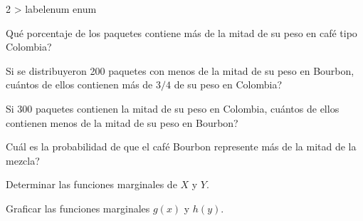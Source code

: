 \documentclass[11pt,letterpaper]{article}
\makeatletter
\renewenvironment{enumerate}
  {\ifnum \@enumdepth >\thr@@\@toodeep\else
   \advance\@enumdepth\@ne
   \edef\@enumctr{enum\romannumeral\the\@enumdepth}%
   \expandafter\list\csname label\@enumctr\endcsname
     {\usecounter\@enumctr
      \setlength{\topsep}{3pt}%
      \setlength{\itemsep}{2pt}%
      \setlength{\parsep}{0pt}%
      \setlength{\partopsep}{0pt}%
      \setlength{\leftmargin}{1.6em}%
      \setlength{\labelsep}{0.4em}}%
   \fi}
  {\endlist}
\makeatother
\begin{document}
\begin{multicols}{2}
\begin{enumerate}
\item Qué porcentaje de los paquetes contiene más de la mitad de su peso en café tipo Colombia?
\item Si se distribuyeron 200 paquetes con menos de la mitad de su peso en Bourbon, cuántos de ellos contienen más de \(3/4\) de su peso en Colombia?
\item Si 300 paquetes contienen la mitad de su peso en Colombia, cuántos de ellos contienen menos de la mitad de su peso en Bourbon?
\item Cuál es la probabilidad de que el café Bourbon represente más de la mitad de la mezcla?
\item Determinar las funciones marginales de \(X\) y \(Y\).
\item Graficar las funciones marginales \(g(x)\) y \(h(y)\).
\end{enumerate}

\end{multicols}
\end{document}
